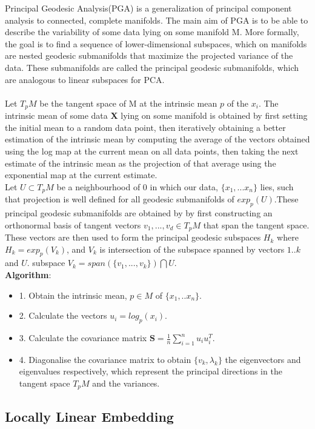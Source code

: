 \documentclass[12pt]{report}
\begin{document}
Principal Geodesic Analysis(PGA) is a generalization of principal component analysis to connected, complete manifolds. The main aim of PGA is to be able to describe the variability of some data lying on some manifold M. More formally, the goal is to find a sequence of lower-dimensional subspaces, which on manifolds are nested geodesic submanifolds that maximize the projected variance of the data. These submanifolds are called the principal geodesic submanifolds, which are analogous to linear subspaces for PCA.\\
\\
Let $T_pM$ be the tangent space of M at the intrinsic mean $p$ of the $x_i$. The intrinsic mean of some data \textbf{X} lying on some manifold is obtained by first setting the initial mean to a random data point, then iteratively obtaining a better estimation of the intrinsic mean by computing the average of the vectors obtained using the log map at the current mean on all data points, then taking the next estimate of the intrinsic mean as the projection of that average using the exponential map at the current estimate.\\
Let $U \subset T_pM$ be a neighbourhood of 0 in which our data, $\{x_1,...x_n\}$ lies, such that projection is well defined for all geodesic submanifolds of $exp_p(U)$.These principal geodesic submanifolds are obtained by by first constructing an orthonormal basis of tangent vectors $v_1,...,v_d \in T_pM$ that span the tangent space. These vectors are then used to form the principal geodesic subspaces $H_k$ where $H_k = exp_p(V_k)$, and $V_k$ is intersection of the subspace spanned by vectors $1..k$ and $U$.
subspace $V_k = span(\{v_1,...,v_k\})\bigcap U$.\\
\textbf{Algorithm}:
\begin{itemize}
    \item 1. Obtain the intrinsic mean, $p \in M$ of $\{x_1,..x_n\}$.
    \item 2. Calculate the vectors $u_i = log_p(x_i)$.
    \item 3. Calculate the covariance matrix $\textbf{S} = \frac{1}{n} \sum^n_{i=1} u_iu_i^T$.
    \item 4. Diagonalise the covariance matrix to obtain $\{v_k, \lambda_k\}$ the eigenvectors and eigenvalues respectively, which represent the principal directions in the tangent space $T_pM$ and the variances.
\end{itemize}

\newpage

\subsection{Locally Linear Embedding}
\end{document}
